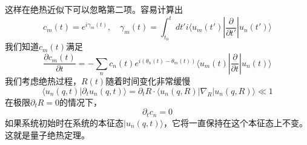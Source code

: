\documentclass{article}
\numberwithin{equation}{subsection}
\begin{document}
这样在绝热近似下可以忽略第二项。容易计算出
\begin{equation}
    c_m(t)=e^{i\gamma_m(t)},\quad \gamma_m(t)=\int_{t_0}^{t}dt'i\langle u_m(t')|\frac{\partial}{\partial t'}|u_n(t')\rangle
\end{equation}
我们知道$c_m(t)$满足
\begin{equation}
    \frac{\partial c_m(t)}{\partial t}=-\sum_nc_n(t)e^{i(\theta_n(t)-\theta_m(t))}\langle u_m(t)|\frac{\partial}{\partial t}|u_n(t)\rangle
\end{equation}
我们考虑绝热过程，$R(t)$随着时间变化非常缓慢
\begin{equation}
    \langle u_n(q,t)|\partial_t u_n(q,t)\rangle=\partial_t R\cdot\langle u_n(q,R)|\nabla_R|u_n(q,R)\rangle\ll 1
\end{equation}
在极限$\partial_t R=0$的情况下，
\begin{equation}
    \partial_t c_n=0
\end{equation}
如果系统初始时在系统的本征态$|u_n(q,t)\rangle$，它将一直保持在这个本征态上不变。这就是量子绝热定理。
\end{document}
